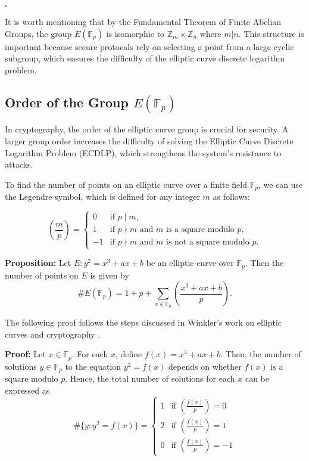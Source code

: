 \documentclass[11pt]{article}
\begin{document}
\hfill \(\square\)

\noindent It is worth mentioning that by the Fundamental Theorem of Finite Abelian Groups, the group \(E(\mathbb{F}_p)\) is isomorphic to \(\mathbb{Z}_m\times \mathbb{Z}_n\) where \(m|n\). This structure is important because secure protocals rely on selecting a point from a large cyclic subgroup, which ensures the difficulty of the elliptic curve discrete logarithm problem.



\subsection{Order of the Group \(E(\mathbb{F}_p)\)}

In cryptography, the order of the elliptic curve group is crucial for security. A larger group order increases the difficulty of solving the Elliptic Curve Discrete Logarithm Problem (ECDLP), which strengthens the system’s resistance to attacks.

\vspace{0.3cm}

To find the number of points on an elliptic curve over a finite field \(\mathbb{F}_p\), we can use the Legendre symbol, which is defined for any integer \(m\) as follows:

\[\left( \frac{m}{p} \right) = 
\begin{cases}
0 & \text{if } p \mid m, \\
1 & \text{if } p \nmid m \text{ and } m \text{ is a square modulo } p, \\
-1 & \text{if } p \nmid m \text{ and } m \text{ is not a square modulo } p.
\end{cases}\]

\textbf{Proposition:} Let \(E: y^2 = x^3 + ax + b\) be an elliptic curve over \(\mathbb{F}_p\). Then the number of points on \(E\) is given by
\[\#E(\mathbb{F}_p) = 1 + p + \sum_{x \in \mathbb{F}_p} \left( \frac{x^3 + ax + b}{p} \right).\]

The following proof follows the steps discussed in Winkler’s work on elliptic curves and cryptography \cite{winkler}.

\vspace{0.3cm}

\textbf{Proof:} Let \(x \in \mathbb{F}_p\). For each \(x\), define \(f(x) = x^3 + ax + b\). Then, the number of solutions \(y \in \mathbb{F}_p\) to the equation \(y^2 = f(x)\) depends on whether \(f(x)\) is a square modulo \(p\). Hence, the total number of solutions for each \(x\) can be expressed as
\[\#\{y : y^2 = f(x)\} =
\begin{cases}
1 & \text{if } \left( \frac{f(x)}{p} \right) = 0 \\
2 & \text{if } \left( \frac{f(x)}{p} \right) = 1 \\
0 & \text{if } \left( \frac{f(x)}{p} \right) = -1
\end{cases}\]
\end{document}
